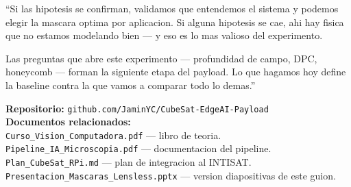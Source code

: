 \documentclass[11pt,a4paper,oneside]{report}
\begin{document}
\begin{decir}
``Si las hipotesis se confirman, validamos que entendemos el sistema y podemos
elegir la mascara optima por aplicacion. Si alguna hipotesis se cae, ahi hay
fisica que no estamos modelando bien --- y eso es lo mas valioso del experimento.

Las preguntas que abre este experimento --- profundidad de campo, DPC, honeycomb ---
forman la siguiente etapa del payload. Lo que hagamos hoy define la baseline contra
la que vamos a comparar todo lo demas.''
\end{decir}

\vspace{1cm}
\noindent\textbf{Repositorio:} \texttt{github.com/JaminYC/CubeSat-EdgeAI-Payload}\\
\textbf{Documentos relacionados:}\\
\texttt{Curso\_Vision\_Computadora.pdf} --- libro de teoria.\\
\texttt{Pipeline\_IA\_Microscopia.pdf} --- documentacion del pipeline.\\
\texttt{Plan\_CubeSat\_RPi.md} --- plan de integracion al INTISAT.\\
\texttt{Presentacion\_Mascaras\_Lensless.pptx} --- version diapositivas de este guion.
\end{document}
